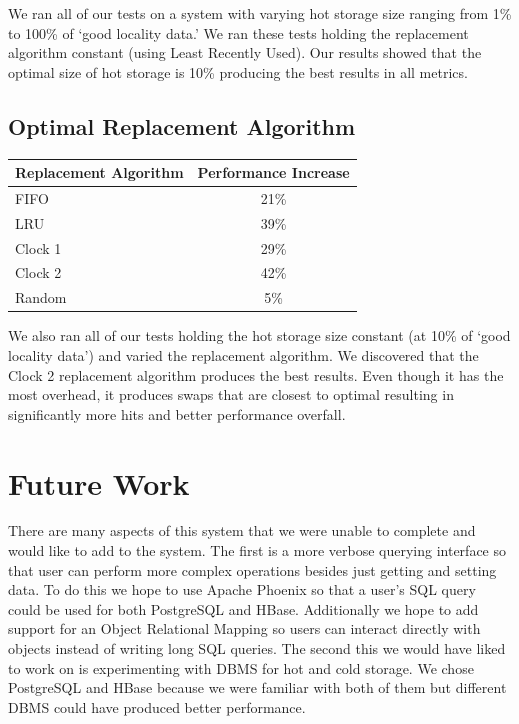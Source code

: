 \documentclass[12pt]{article}
\begin{document}
We ran all of our tests on a system with varying hot storage size ranging from 1\% to 100\% of ‘good locality data.’ We ran these tests holding the replacement algorithm constant (using Least Recently Used). Our results showed that the optimal size of hot storage is 10\% producing the best results in all metrics. 

\subsection{Optimal Replacement Algorithm}

\begin{center}
  \begin{tabular}{ | l | c |}
    \hline
    Replacement Algorithm & Performance Increase \\ \hline \hline
    FIFO & 21\% \\ \hline 
    LRU & 39\% \\ \hline
    Clock 1 & 29\% \\ \hline
    Clock 2 & 42\% \\ \hline
    Random & 5\% \\
    \hline
  \end{tabular}
\end{center}

We also ran all of our tests holding the hot storage size constant (at 10\% of ‘good locality data’) and varied the replacement algorithm. We discovered that the Clock 2 replacement algorithm produces the best results. Even though it has the most overhead, it produces swaps that are closest to optimal resulting in significantly more hits and better performance overfall.

\section{Future Work}
There are many aspects of this system that we were unable to complete and would like to add to the system. The first is a more verbose querying interface so that user can perform more complex operations besides just getting and setting data. To do this we hope to use Apache Phoenix so that a user’s SQL query could be used for both PostgreSQL and HBase. Additionally we hope to add support for an Object Relational Mapping so users can interact directly with objects instead of writing long SQL queries. 
The second this we would have liked to work on is experimenting with DBMS for hot and cold storage. We chose PostgreSQL and HBase because we were familiar with both of them but different DBMS could have produced better performance.
\end{document}
